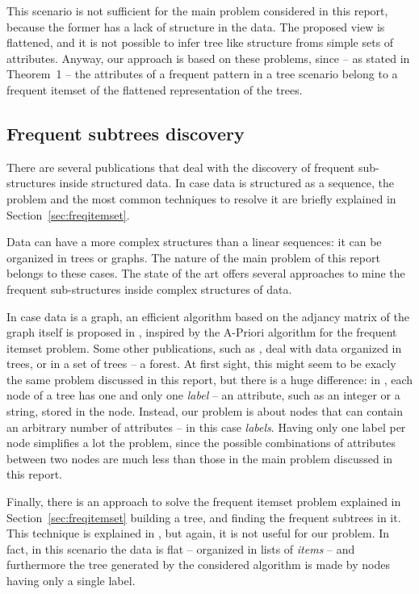 \documentclass{acm_proc_article-sp-sigmod09}
\begin{document}
This scenario is not sufficient for the main problem considered in this report, because the former has a lack of structure in the data. The proposed view is flattened, and it is not possible to infer tree like structure froms simple sets of attributes. Anyway, our approach is based on these problems, since -- as stated in Theorem~1 -- the attributes of a frequent pattern in a tree scenario belong to a frequent itemset of the flattened representation of the trees.

\subsection{Frequent subtrees discovery}
There are several publications that deal with the discovery of frequent sub-structures inside structured data. In case data is structured as a sequence, the problem and the most common techniques to resolve it are briefly explained in Section~\ref{sec:freqitemset}.

Data can have a more complex structures than a linear sequences: it can be organized in trees or graphs. The nature of the main problem of this report belongs to these cases. The state of the art offers several approaches to mine the frequent sub-structures inside complex structures of data.

In case data is a graph, an efficient algorithm based on the adjancy matrix of the graph itself is proposed in \cite{inokuchi2000apriori, kuramochi2001frequent}, inspired by the A-Priori algorithm for the frequent itemset problem. Some other publications, such as \cite{zaki2002efficiently}, deal with data organized in trees, or in a set of trees -- a forest. At first sight, this might seem to be exacly the same problem discussed in this report, but there is a huge difference: in \cite{zaki2002efficiently}, each node of a tree has one and only one \emph{label} -- an attribute, such as an integer or a string, stored in the node. Instead, our problem is about nodes that can contain an arbitrary number of attributes -- in this case \emph{labels}. Having only one label per node simplifies a lot the problem, since the possible combinations of attributes between two nodes are much less than those in the main problem discussed in this report.

Finally, there is an approach to solve the frequent itemset problem explained in Section~\ref{sec:freqitemset} building a tree, and finding the frequent subtrees in it. This technique is explained in \cite{han2004mining}, but again, it is not useful for our problem. In fact, in this scenario the data is flat -- organized in lists of \emph{items} -- and furthermore the tree generated by the considered algorithm is made by nodes having only a single label.
\end{document}

